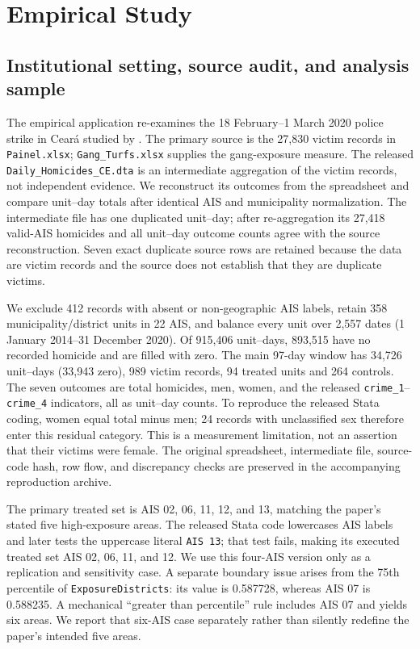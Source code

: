 \clearpage
\section{Empirical Study}\label{sec:empirical}

\subsection{Institutional setting, source audit, and analysis sample}
The empirical application re-examines the 18 February--1 March 2020 police strike in Cear\'a studied by \cite{mancha2025}. The primary source is the 27,830 victim records in \texttt{Painel.xlsx}; \texttt{Gang\_Turfs.xlsx} supplies the gang-exposure measure. The released \texttt{Daily\_Homicides\_CE.dta} is an intermediate aggregation of the victim records, not independent evidence. We reconstruct its outcomes from the spreadsheet and compare unit--day totals after identical AIS and municipality normalization. The intermediate file has one duplicated unit--day; after re-aggregation its 27,418 valid-AIS homicides and all unit--day outcome counts agree with the source reconstruction. Seven exact duplicate source rows are retained because the data are victim records and the source does not establish that they are duplicate victims.

We exclude 412 records with absent or non-geographic AIS labels, retain 358 municipality/district units in 22 AIS, and balance every unit over 2,557 dates (1 January 2014--31 December 2020). Of 915,406 unit--days, 893,515 have no recorded homicide and are filled with zero. The main 97-day window has 34,726 unit--days (33,943 zero), 989 victim records, 94 treated units and 264 controls. The seven outcomes are total homicides, men, women, and the released \texttt{crime\_1}--\texttt{crime\_4} indicators, all as unit--day counts. To reproduce the released Stata coding, women equal total minus men; 24 records with unclassified sex therefore enter this residual category. This is a measurement limitation, not an assertion that their victims were female. The original spreadsheet, intermediate file, source-code hash, row flow, and discrepancy checks are preserved in the accompanying reproduction archive.

The primary treated set is AIS 02, 06, 11, 12, and 13, matching the paper's stated five high-exposure areas. The released Stata code lowercases AIS labels and later tests the uppercase literal \texttt{AIS 13}; that test fails, making its executed treated set AIS 02, 06, 11, and 12. We use this four-AIS version only as a replication and sensitivity case. A separate boundary issue arises from the 75th percentile of \texttt{ExposureDistricts}: its value is 0.587728, whereas AIS 07 is 0.588235. A mechanical ``greater than percentile'' rule includes AIS 07 and yields six areas. We report that six-AIS case separately rather than silently redefine the paper's intended five areas.

